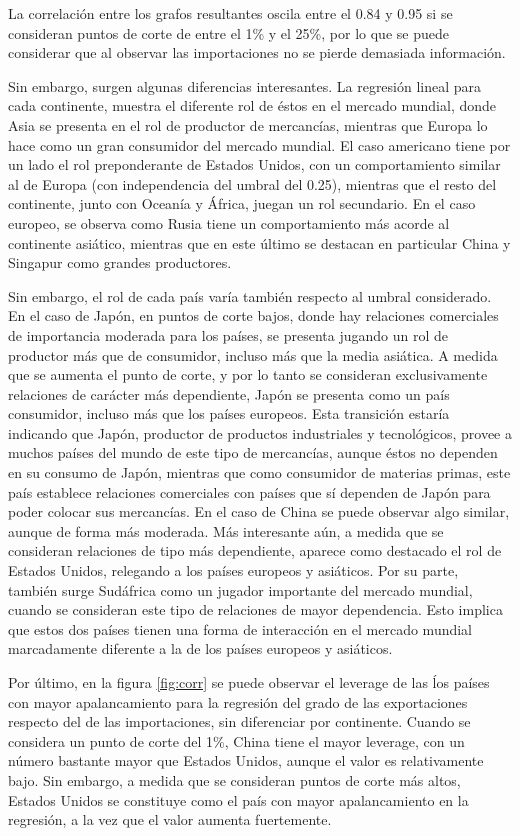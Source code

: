 \documentclass[runningheads,a4paper]{llncs}
\begin{document}
La correlación entre los grafos resultantes oscila entre el 0.84 y 0.95 si se consideran puntos de corte de entre el 1\% y el 25\%, por lo que se puede considerar que al observar las importaciones no se pierde demasiada información.

Sin embargo, surgen algunas diferencias interesantes. La regresión lineal para cada continente, muestra el diferente rol de éstos en el mercado mundial, donde Asia se presenta en el rol de productor de mercancías, mientras que Europa lo hace como un gran consumidor del mercado mundial. El caso americano tiene por un lado el rol preponderante de Estados Unidos, con un comportamiento similar al de Europa (con independencia del umbral del 0.25), mientras que el resto del continente, junto con Oceanía y África, juegan un rol secundario. En el caso europeo, se observa como Rusia tiene un comportamiento más acorde al continente asiático, mientras que en este último se destacan en particular China y Singapur como grandes productores.      

Sin embargo, el rol de cada país varía también respecto al umbral considerado. En el caso de Japón, en puntos de corte bajos, donde hay relaciones comerciales de importancia moderada para los países, se presenta jugando un rol de productor más que de consumidor, incluso más que la media asiática. A medida que se aumenta el punto de corte, y por lo tanto se consideran exclusivamente relaciones de carácter más dependiente, Japón se presenta como un país consumidor, incluso más que los países europeos. Esta transición estaría indicando que Japón, productor de productos industriales y tecnológicos, provee a muchos países del mundo de este tipo de mercancías, aunque éstos no dependen en su consumo de Japón, mientras que como consumidor de materias primas, este país establece relaciones comerciales con países que sí dependen de Japón para poder colocar sus mercancías. En el caso de China se puede observar algo similar, aunque de forma más moderada. Más interesante aún, a medida que se consideran relaciones de tipo más dependiente, aparece como destacado el rol de Estados Unidos, relegando a los países europeos y asiáticos. Por su parte, también surge Sudáfrica como un jugador importante del mercado mundial, cuando se consideran este tipo de relaciones de mayor dependencia. Esto implica que estos dos países tienen una forma de interacción en el mercado mundial marcadamente diferente a la de los países europeos y asiáticos.       

Por último, en la figura \ref{fig:corr} se puede observar el leverage de las ĺos países con mayor apalancamiento para la regresión del grado de las exportaciones respecto del de las importaciones, sin diferenciar por continente. Cuando se considera un punto de corte del 1\%, China tiene el mayor leverage, con un número bastante mayor que Estados Unidos, aunque el valor es relativamente bajo. Sin embargo, a medida que se consideran puntos de corte más altos, Estados Unidos se constituye como el país con mayor apalancamiento en la regresión, a la vez que el valor aumenta fuertemente.      
\end{document}

